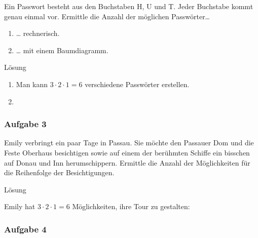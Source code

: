 \documentclass[
  ngerman,
]{book}
\begin{document}
Ein Passwort besteht aus den Buchstaben H, U und T. Jeder Buchstabe kommt genau einmal vor. Ermittle die Anzahl der möglichen Passwörter\ldots{}

\begin{enumerate}
\def\labelenumi{\alph{enumi})}
\item
  \ldots{} rechnerisch.
\item
  \ldots{} mit einem Baumdiagramm.
\end{enumerate}

Lösung

\begin{enumerate}
\def\labelenumi{\alph{enumi})}
\item
  Man kann \(3 \cdot 2 \cdot 1 = 6\) verschiedene Passwörter erstellen.
\item
\end{enumerate}

\hypertarget{section-107}{%
\subsubsection*{}\label{section-107}}

\hypertarget{aufgabe-3-5}{%
\subsubsection*{Aufgabe 3}\label{aufgabe-3-5}}

Emily verbringt ein paar Tage in Passau. Sie möchte den Passauer Dom und die Feste Oberhaus besichtigen sowie auf einem der berühmten Schiffe ein bisschen auf Donau und Inn herumschippern. Ermittle die Anzahl der Möglichkeiten für die Reihenfolge der Besichtigungen.

Lösung

Emily hat \(3 \cdot 2 \cdot 1 =6\) Möglichkeiten, ihre Tour zu gestalten:

\hypertarget{section-108}{%
\subsubsection*{}\label{section-108}}

\hypertarget{aufgabe-4-2}{%
\subsubsection*{Aufgabe 4}\label{aufgabe-4-2}}
\end{document}
